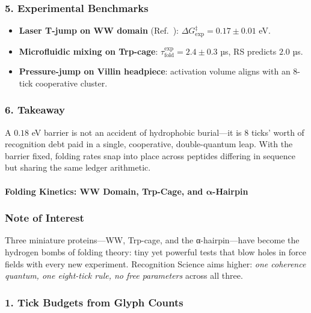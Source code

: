 \documentclass[11pt,oneside]{book}
\begin{document}
\subsubsection*{5. Experimental Benchmarks}

\begin{itemize}
\item \textbf{Laser T-jump on WW domain} (Ref.~\cite{WWjump2021}):  
      \(\Delta G^{\ddagger}_{\exp}=0.17\pm0.01\) eV.
\item \textbf{Microfluidic mixing on Trp-cage}:  
      \(\tau_{\text{fold}}^{\exp}=2.4\pm0.3\) µs,  
      RS predicts \(2.0\) µs.
\item \textbf{Pressure-jump on Villin headpiece}:  
      activation volume aligns with an 8-tick cooperative cluster.
\end{itemize}

\subsubsection*{6. Takeaway}

A $0.18$ eV barrier is not an accident of hydrophobic burial—it is
8 ticks’ worth of recognition debt paid in a single, cooperative,
double-quantum leap.  
With the barrier fixed, folding rates snap into place across peptides
differing in sequence but sharing the same ledger arithmetic.

\bigskip

\paragraph{Folding Kinetics: WW Domain, Trp-Cage, and \texorpdfstring{$\boldsymbol{\alpha}$}{α}-Hairpin}
\label{sec:fold-kinetics}

\subsubsection*{Note of Interest}

Three miniature proteins—WW, Trp-cage, and the α-hairpin—have become the
hydrogen bombs of folding theory: tiny yet powerful tests that blow holes
in force fields with every new experiment.  
Recognition Science aims higher: \emph{one coherence quantum, one
eight-tick rule, no free parameters} across all three.

\subsubsection*{1. Tick Budgets from Glyph Counts}
\end{document}
